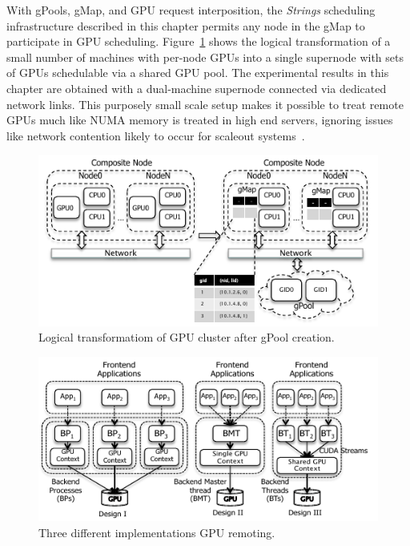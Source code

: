 With  gPools,  gMap,  and  GPU  request  interposition,  the \textit{Strings} scheduling infrastructure described in this chapter permits any node in the gMap to participate in GPU scheduling. Figure~\ref{fig:GPool} shows the logical transformation of a small number of machines with per-node GPUs into a single supernode with sets of GPUs schedulable via a shared GPU pool. The experimental results in this chapter are obtained with a dual-machine supernode connected via dedicated network links. This purposely small scale setup makes it possible to treat remote GPUs much like NUMA memory is treated in high end servers, ignoring issues like network contention likely to occur for scaleout systems~\cite{shadowfax}.
\begin{figure}[!t]
\centering
\includegraphics[width=\textwidth,height=\textheight,keepaspectratio]{figures/GPool.pdf}
\caption{Logical transformatiom of GPU cluster after gPool creation. }
\label{fig:GPool}
\end{figure}
\begin{figure}[!t]
\centering
\includegraphics[width=\textwidth,height=\textheight,keepaspectratio]{figures/Strings-design.pdf}
\caption{Three different implementations GPU remoting.}
\label{fig:Strings-design}
\end{figure}

